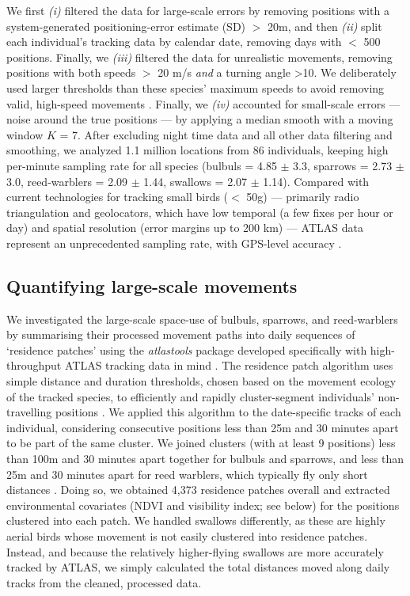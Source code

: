 \begin{refsection}
We first \textit{(i)} filtered the data for large-scale errors by removing positions with a system-generated positioning-error estimate (SD) $>$ 20m, and then \textit{(ii)} split each individual's tracking data by calendar date, removing days with $<$ 500 positions. 
Finally, we \textit{(iii)} filtered the data for unrealistic movements, removing positions with both speeds $>$ 20 m/s \emph{and} a turning angle >10\textdegree.
We deliberately used larger thresholds than these species' maximum speeds to avoid removing valid, high-speed movements \citep{gupte2022d}.
Finally, we \textit{(iv)} accounted for small-scale errors --- noise around the true positions --- by applying a median smooth with a moving window $K$ = 7.
After excluding night time data and all other data filtering and smoothing, we analyzed 1.1 million locations from 86 individuals, keeping high per-minute sampling rate for all species (bulbuls = 4.85 $\pm$ 3.3, sparrows = 2.73 $\pm$ 3.0, reed-warblers = 2.09 $\pm$ 1.44, swallows = 2.07 $\pm$ 1.14).
Compared with current technologies for tracking small birds ($<$ 50g) --- primarily radio triangulation and geolocators, which have low temporal (a few fixes per hour or day) and spatial resolution (error margins up to 200 km) \citep{bridge2013} --- ATLAS data represent an unprecedented sampling rate, with GPS-level accuracy \citep{beardsworth}.

\subsection{Quantifying large-scale movements}

We investigated the large-scale space-use of bulbuls, sparrows, and reed-warblers by summarising their processed movement paths into daily sequences of `residence patches' using the \textit{atlastools} package developed specifically with high-throughput ATLAS tracking data in mind \citep{gupte2022d}.
The residence patch algorithm uses simple distance and duration thresholds, chosen based on the movement ecology of the tracked species, to efficiently and rapidly cluster-segment individuals' non-travelling positions \citep{gupte2022d}.
We applied this algorithm to the date-specific tracks of each individual, considering consecutive positions less than 25m and 30 minutes apart to be part of the same cluster.
We joined clusters (with at least 9 positions) less than 100m and 30 minutes apart together for bulbuls and sparrows, and less than 25m and 30 minutes apart for reed warblers, which typically fly only short distances \cite{kiat2016}.
Doing so, we obtained 4,373 residence patches overall and extracted environmental covariates (NDVI and visibility index; see below) for the positions clustered into each patch.
We handled swallows differently, as these are highly aerial birds whose movement is not easily clustered into residence patches.
Instead, and because the relatively higher-flying swallows are more accurately tracked by ATLAS, we simply calculated the total distances moved along daily tracks from the cleaned, processed data.


\end{refsection}
